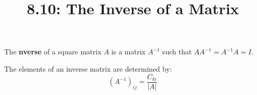\documentclass{article}
\title{8.10: The Inverse of a Matrix}
\begin{document}
\maketitle
\begin{definition}[Inverse]
The \textbf{nverse} of a square matrix $A$ is a matrix $A ^{-1} $ such that $A A ^{-1}  = A ^{-1} A = I$.
\end{definition}

The elements of an inverse matrix are determined by: $$ (A ^{-1} )_{ij} = \frac{C_{ki}}{\vert A \vert}$$
\end{document}
